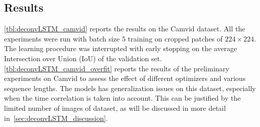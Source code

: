 \subsection{Results}\label{sec:deconvLSTM_results}

\autoref{tbl:deconvLSTM_camvid} reports the results on the Camvid dataset. All
the experiments were run with batch size $5$ training on cropped patches of
$224 \times 224$. The learning procedure was interrupted with early stopping on
the average Intersection over Union (IoU) of the validation set.
\autoref{tbl:deconvLSTM_camvid_overfit} reports the results of the preliminary
experiments on Camvid to assess the effect of different optimizers and various
sequence lengths. The models has generalization issues on this dataset,
especially when the time correlation is taken into account. This can be
justified by the limited number of images of dataset, as will be discussed
in more detail in~\autoref{sec:deconvLSTM_discussion}.

\begin{table}[t]
    \caption{Results on the CamVid dataset. Pixel accuracy and average
        Intersection over Union (IoU) are reported.}
    \label{tbl:deconvLSTM_camvid}
\end{table}

